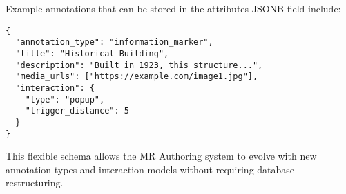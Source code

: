 Example annotations that can be stored in the attributes JSONB field include:
\begin{verbatim}
{
  "annotation_type": "information_marker",
  "title": "Historical Building",
  "description": "Built in 1923, this structure...",
  "media_urls": ["https://example.com/image1.jpg"],
  "interaction": {
    "type": "popup",
    "trigger_distance": 5
  }
}
\end{verbatim}

This flexible schema allows the MR Authoring system to evolve with new annotation types and interaction models without requiring database restructuring.